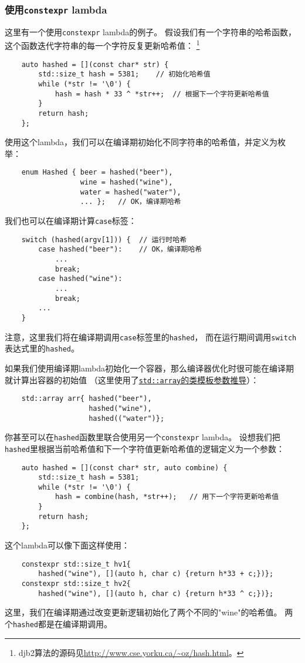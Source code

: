 \subsubsection{使用\texttt{constexpr} lambda}
这里有一个使用\texttt{constexpr} lambda的例子。
假设我们有一个字符串的哈希函数，这个函数迭代字符串的每一个字符反复更新哈希值：
\footnote{djb2算法的源码见\url{http://www.cse.yorku.ca/~oz/hash.html}。}
\begin{lstlisting}
    auto hashed = [](const char* str) {
        std::size_t hash = 5381;    // 初始化哈希值
        while (*str != '\0') {
            hash = hash * 33 ^ *str++;  // 根据下一个字符更新哈希值
        }
        return hash;
    };
\end{lstlisting}
使用这个lambda，我们可以在编译期初始化不同字符串的哈希值，并定义为枚举：
\begin{lstlisting}
    enum Hashed { beer = hashed("beer"),
                  wine = hashed("wine"),
                  water = hashed("water"),
                  ... };   // OK，编译期哈希
\end{lstlisting}
我们也可以在编译期计算\texttt{case}标签：
\begin{lstlisting}
    switch (hashed(argv[1])) {  // 运行时哈希
        case hashed("beer"):    // OK，编译期哈希
            ...
            break;
        case hashed("wine"):
            ...
            break;
        ...
    }
\end{lstlisting}
注意，这里我们将在编译期调用\texttt{case}标签里的\texttt{hashed}，
而在运行期间调用\texttt{switch}表达式里的\texttt{hashed}。

如果我们使用编译期lambda初始化一个容器，那么编译器优化时很可能在编译期就计算出容器的初始值
（这里使用了\hyperref[ch9.2.6.3]{\texttt{std::array}的类模板参数推导}）：
\begin{lstlisting}
    std::array arr{ hashed("beer"),
                    hashed("wine"),
                    hashed(("water")};
\end{lstlisting}
你甚至可以在\texttt{hashed}函数里联合使用另一个\texttt{constexpr} lambda。
设想我们把\texttt{hashed}里根据当前哈希值和下一个字符值更新哈希值的逻辑定义为一个参数：
\begin{lstlisting}
    auto hashed = [](const char* str, auto combine) {
        std::size_t hash = 5381;
        while (*str != '\0') {
            hash = combine(hash, *str++);   // 用下一个字符更新哈希值
        }
        return hash;
    };
\end{lstlisting}
这个lambda可以像下面这样使用：
\begin{lstlisting}
    constexpr std::size_t hv1{
        hashed("wine"), [](auto h, char c) {return h*33 + c;})};
    constexpr std::size_t hv2{
        hashed("wine"), [](auto h, char c) {return h*33 ^ c;})};
\end{lstlisting}
这里，我们在编译期通过改变更新逻辑初始化了两个不同的"wine"的哈希值。
两个\texttt{hashed}都是在编译期调用。

